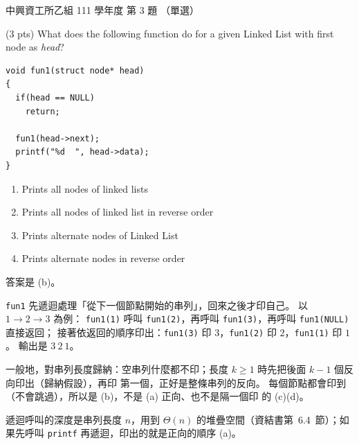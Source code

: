 \begin{pastexam}[label={px:nchu-111-is-03}]{中興資工所乙組 111 學年度 第 3 題}
（單選）

(3 pts) What does the following function do for a given Linked List with first node as \textit{head}?
\begin{verbatim}
void fun1(struct node* head)
{
  if(head == NULL)
    return;

  fun1(head->next);
  printf("%d  ", head->data);
}
\end{verbatim}
\begin{enumerate}[label=(\alph*).]
\item Prints all nodes of linked lists
\item Prints all nodes of linked list in reverse order
\item Prints alternate nodes of Linked List
\item Prints alternate nodes in reverse order
\end{enumerate}
\end{pastexam}

\begin{pastsoln}
答案是 (b)。

\texttt{fun1} 先遞迴處理「從下一個節點開始的串列」，回來之後才印自己。 以 $1 \to 2 \to 3$ 為例：
\texttt{fun1(1)} 呼叫 \texttt{fun1(2)}，再呼叫 \texttt{fun1(3)}，再呼叫 \texttt{fun1(NULL)} 直接返回；
接著依返回的順序印出：\texttt{fun1(3)} 印 $3$，\texttt{fun1(2)} 印 $2$，\texttt{fun1(1)} 印 $1$。
輸出是 $3\ 2\ 1$。

一般地，對串列長度歸納：空串列什麼都不印；長度 $k \ge 1$ 時先把後面 $k - 1$ 個反向印出（歸納假設），再印
第一個，正好是整條串列的反向。 每個節點都會印到（不會跳過），所以是 (b)，不是 (a) 正向、也不是隔一個印
的 (c)(d)。

遞迴呼叫的深度是串列長度 $n$，用到 $\Theta(n)$ 的堆疊空間（資結書第~6.4~節）；如果先呼叫
\texttt{printf} 再遞迴，印出的就是正向的順序 (a)。
\end{pastsoln}
